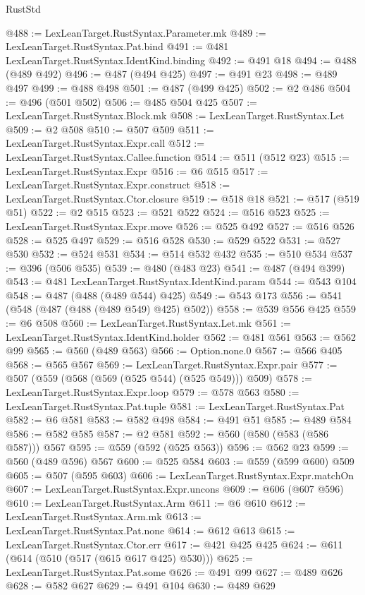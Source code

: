 \begin{lexlean}{RustStd}
\begin{coremodule}
@488 := LexLeanTarget.RustSyntax.Parameter.mk
@489 := LexLeanTarget.RustSyntax.Pat.bind
@491 := @481 LexLeanTarget.RustSyntax.IdentKind.binding
@492 := @491 @18
@494 := @488 (@489 @492)
@496 := @487 (@494 @425)
@497 := @491 @23
@498 := @489 @497
@499 := @488 @498
@501 := @487 (@499 @425)
@502 := @2 @486
@504 := @496 (@501 @502)
@506 := @485 @504 @425
@507 := LexLeanTarget.RustSyntax.Block.mk
@508 := LexLeanTarget.RustSyntax.Let
@509 := @2 @508
@510 := @507 @509
@511 := LexLeanTarget.RustSyntax.Expr.call
@512 := LexLeanTarget.RustSyntax.Callee.function
@514 := @511 (@512 @23)
@515 := LexLeanTarget.RustSyntax.Expr
@516 := @6 @515
@517 := LexLeanTarget.RustSyntax.Expr.construct
@518 := LexLeanTarget.RustSyntax.Ctor.closure
@519 := @518 @18
@521 := @517 (@519 @51)
@522 := @2 @515
@523 := @521 @522
@524 := @516 @523
@525 := LexLeanTarget.RustSyntax.Expr.move
@526 := @525 @492
@527 := @516 @526
@528 := @525 @497
@529 := @516 @528
@530 := @529 @522
@531 := @527 @530
@532 := @524 @531
@534 := @514 @532 @432
@535 := @510 @534
@537 := @396 (@506 @535)
@539 := @480 (@483 @23)
@541 := @487 (@494 @399)
@543 := @481 LexLeanTarget.RustSyntax.IdentKind.param
@544 := @543 @104
@548 := @487 (@488 (@489 @544) @425)
@549 := @543 @173
@556 := @541 (@548 (@487 (@488 (@489 @549) @425) @502))
@558 := @539 @556 @425
@559 := @6 @508
@560 := LexLeanTarget.RustSyntax.Let.mk
@561 := LexLeanTarget.RustSyntax.IdentKind.holder
@562 := @481 @561
@563 := @562 @99
@565 := @560 (@489 @563)
@566 := Option.none.{0}
@567 := @566 @405
@568 := @565 @567
@569 := LexLeanTarget.RustSyntax.Expr.pair
@577 := @507 (@559 (@568 (@569 (@525 @544) (@525 @549))) @509)
@578 := LexLeanTarget.RustSyntax.Expr.loop
@579 := @578 @563
@580 := LexLeanTarget.RustSyntax.Pat.tuple
@581 := LexLeanTarget.RustSyntax.Pat
@582 := @6 @581
@583 := @582 @498
@584 := @491 @51
@585 := @489 @584
@586 := @582 @585
@587 := @2 @581
@592 := @560 (@580 (@583 (@586 @587))) @567
@595 := @559 (@592 (@525 @563))
@596 := @562 @23
@599 := @560 (@489 @596) @567
@600 := @525 @584
@603 := @559 (@599 @600) @509
@605 := @507 (@595 @603)
@606 := LexLeanTarget.RustSyntax.Expr.matchOn
@607 := LexLeanTarget.RustSyntax.Expr.uncons
@609 := @606 (@607 @596)
@610 := LexLeanTarget.RustSyntax.Arm
@611 := @6 @610
@612 := LexLeanTarget.RustSyntax.Arm.mk
@613 := LexLeanTarget.RustSyntax.Pat.none
@614 := @612 @613
@615 := LexLeanTarget.RustSyntax.Ctor.err
@617 := @421 @425 @425
@624 := @611 (@614 (@510 (@517 (@615 @617 @425) @530)))
@625 := LexLeanTarget.RustSyntax.Pat.some
@626 := @491 @99
@627 := @489 @626
@628 := @582 @627
@629 := @491 @104
@630 := @489 @629

\end{coremodule}
\end{lexlean}
